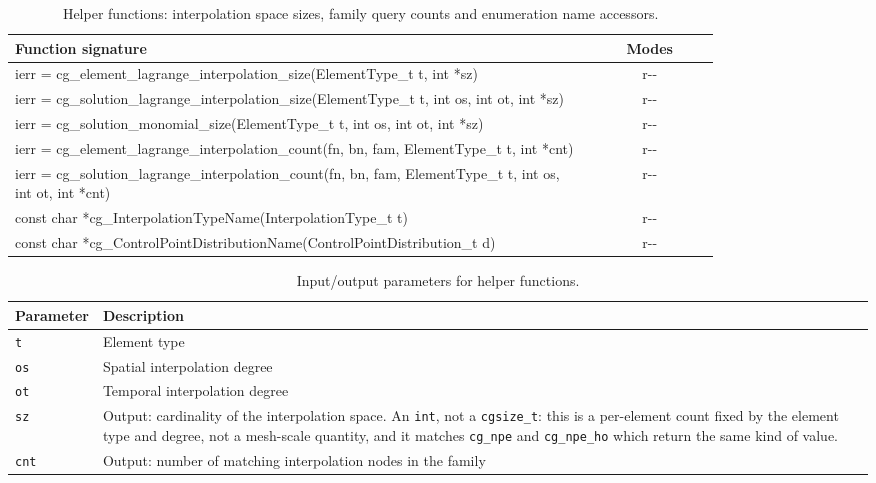 \documentclass[11pt,letterpaper]{article}
\newif\ifvfourdraft
\newcommand{\vfour}[1]{\ifvfourdraft\textcolor{v4violet}{#1}\else#1\fi}
\begin{document}
\begin{table}[htbp]
\centering
\small
{}
\begin{tabular}{@{} >{\raggedright\ttfamily\small}p{0.82\linewidth} c @{}}
\toprule
\textbf{Function signature} & \textbf{Modes} \\
\midrule
ierr = cg\_element\_lagrange\_interpolation\_size(ElementType\_t t, \vfour{int} *sz) & r{-}{-} \\
ierr = cg\_solution\_lagrange\_interpolation\_size(ElementType\_t t, int os, int ot, \vfour{int} *sz) & r{-}{-} \\
ierr = cg\_solution\_monomial\_size(ElementType\_t t, int os, int ot, \vfour{int} *sz) & r{-}{-} \\
\addlinespace
ierr = cg\_element\_lagrange\_interpolation\_count(fn, bn, fam, ElementType\_t t, int *cnt) & r{-}{-} \\
ierr = cg\_solution\_lagrange\_interpolation\_count(fn, bn, fam, ElementType\_t t, int os, int ot, int *cnt) & r{-}{-} \\
\addlinespace
\vfour{const char *cg\_InterpolationTypeName(InterpolationType\_t t)} & \vfour{r{-}{-}} \\
\vfour{const char *cg\_ControlPointDistributionName(ControlPointDistribution\_t d)} & \vfour{r{-}{-}} \\
\bottomrule
\end{tabular}
\caption{Helper functions: interpolation space sizes, family query counts
\vfour{and enumeration name accessors}.}
\label{tab:helper-funcs}
\end{table}

\begin{table}[htbp]
\centering
\small
{}
\begin{tabular}{@{} l p{} @{}}
\toprule
\textbf{Parameter} & \textbf{Description} \\
\midrule
\texttt{t}   & Element type \\
\texttt{os}  & Spatial interpolation degree \\
\texttt{ot}  & Temporal interpolation degree \\
\texttt{sz}  & Output: cardinality of the interpolation space.
  \vfour{An \texttt{int}, not a \texttt{cgsize\_t}: this is a per-element count
  fixed by the element type and degree, not a mesh-scale quantity, and it
  matches \texttt{cg\_npe} and \texttt{cg\_npe\_ho} which return the same kind of
  value.} \\
\texttt{cnt} & Output: number of matching interpolation nodes in the family \\
\bottomrule
\end{tabular}
\caption{Input/output parameters for helper functions.}
\end{table}
\end{document}
